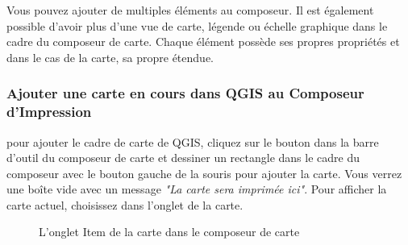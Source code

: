{%
Vous pouvez ajouter de multiples éléments au composeur. Il est également
possible d'avoir plus d'une vue de carte, légende ou échelle graphique dans le
cadre du composeur de carte. Chaque élément possède ses propres propriétés et
dans le cas de la carte, sa propre étendue.

\subsubsection{Ajouter une carte en cours dans QGIS au Composeur d'Impression}

pour ajouter le cadre de carte de QGIS, cliquez sur le bouton
 dans la barre d'outil du composeur de carte et dessiner
un rectangle dans le cadre du composeur avec le bouton gauche de la souris pour
ajouter la carte. Vous verrez une boîte vide avec un message \textit{"La
carte sera imprimée ici"}. Pour afficher la carte actuel, choisissez
 dans l'onglet  de la carte.

\begin{figure}[ht]
\centering
\caption{L'onglet Item de la carte dans le composeur de carte
\nixcaption}\label{fig:print_composer_map_item}
   \goodgap
\end{figure}

}

